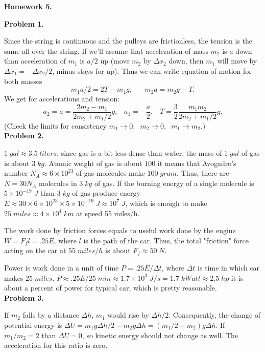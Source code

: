 \documentclass[12pt]{article}
\begin{document}
\begin{center}
{\bf\large Homework 5.}
\end{center}

{\bf Problem 1.}

Since the string is continuous and the pulleys are frictionless, the tension is the same
all over the string.  If we'll assume that acceleration of mass $m_2$ is $a$ down than
acceleration of $m_1$ is $a/2$ up (move $m_2$ by $\Delta x_2$ down, then $m_1$ will
move by $\Delta x_1=-\Delta x_2/2$, minus stays for up). Thus we can write equation of motion
for both masses
$$
m_1 a/2=2 T -m_1 g,\;\;\;\;\;\; m_2 a= m_2 g - T.
$$
We get for accelerations and tension:
$$
a_2=a=\frac{2m_2 -m_1}{2m_2+m_1/2}g,\;\;\;a_1=-\frac{a}{2},\;\;\;T=\frac{3}{2}\frac{m_1m_2}{2m_2+m_1/2}g.$$
(Check the limits for consistency $m_1\rightarrow 0,\;\;m_2\rightarrow 0,\;\; m_1\rightarrow m_2$.)
\\

{\bf Problem 2.}

$1\;gal\approx3.5\;liters$, since gas is a bit less dense than water, the mass of $1\;gal$ of gas is
about $3\;kg$. Atomic weight of gas is about $100$ it means that Avogadro's number
$N_A\approx 6\times 10^{23}$ of
gas molecules make $100\;gram$. Thus, there are $N=30 N_A$ molecules in $3\;kg$ of gas. 
If the burning energy of a single molecule is $5\times 10^{-19}\;J$ than $3\;kg$ of gas produce
energy $E\approx 30\times6\times 10^{23}\times 5\times 10^{-19}\;J\approx 10^{7}\;J$, which is enough to make $25\; miles\approx 4\times 10^4\;km$ at speed 55 miles/h. 

The work done by friction forces equals to useful work done by the engine $W=F_f l=.25 E$,
where $l$ is the path of the car. Thus, the total "friction" force  acting on the car at $55\;miles/h$
is about $F_f\approx 50\;N$.

Power is work done in a unit of time $P=.25 E/\Delta t$, where $\Delta t$ is time in which car makes
$25\;miles$. $P\approx .25 E/25\;min\approx 1.7\times 10^3\; J/s=1.7\;kWatt\approx2.5\;hp$ it is about a percent of power for typical car, which is pretty reasonable.
\\

{\bf Problem 3.}

If $m_2$ falls by a distance $\Delta h$,  $m_1$ would rise by $\Delta h/2$.
Consequently, the change of potential energy is $\Delta U=m_1g\Delta h/2 -m_2g\Delta h=(m_1/2-m_2)g\Delta h$. If $m_1/m_2=2$ than $\Delta U=0$, so kinetic energy should not change as well.
The acceleration for this ratio is zero.
\end{document}
